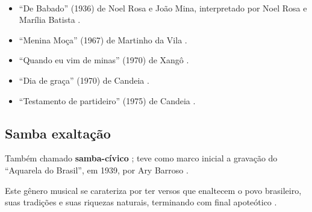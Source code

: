 \begin{example} ~

\begin{itemize}
\item ``De Babado'' (1936) de Noel Rosa e João Mina, interpretado por  Noel Rosa e Marília Batista \cite[pp. 46]{diniz2006almanaque}.
\item ``Menina Moça'' (1967) de Martinho da Vila \cite[pp. 185]{diniz2006almanaque}.
\item ``Quando eu vim de minas'' (1970) de Xangô \cite[pp. 212]{diniz2006almanaque}.
\item ``Dia de graça'' (1970) de Candeia \cite[pp. 137]{marcondes1977enciclopedia} \cite[pp. 121]{diniz2006almanaque}.
\item ``Testamento de partideiro'' (1975) de Candeia \cite[pp. 105]{raca1999} \cite[pp. 122]{diniz2006almanaque}.
\end{itemize}
\end{example}


\subsection{Samba exaltação}
Também chamado \textbf{samba-cívico} \cite[pp. 105]{naves1998violao};
teve como marco inicial a gravação do ``Aquarela do Brasil'', em 1939, 
por Ary Barroso \cite[pp. 73]{diniz2006almanaque} \cite[pp. 128]{perna2002samba} \cite[pp. 77]{fenerick2005nem}.

Este gênero musical se carateriza por ter versos que enaltecem o povo brasileiro, 
suas tradições e suas riquezas naturais, terminando com final apoteótico  \cite[pp. 73]{diniz2006almanaque}.


